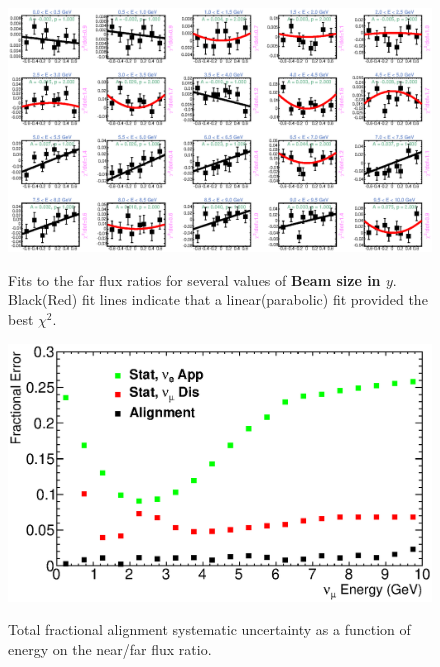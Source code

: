 \begin{figure}[ht]
  \begin{center}
    {\includegraphics[width=5.0in]{figures/BeamSigmaY_far_fits.eps}}
  \end{center}
\caption{ Fits to the far flux ratios for several values of {\bf Beam size in $y$}. Black(Red) fit lines indicate that a linear(parabolic) fit provided the best $\chi^2$. }
\end{figure}

\begin{figure}[ht]
  \begin{center}
    {\includegraphics[width=6.0in]{figures/tot_error_nof.eps}}
  \end{center}
\caption{ Total fractional alignment systematic uncertainty as a function of energy on the near/far flux ratio. }
\end{figure}

